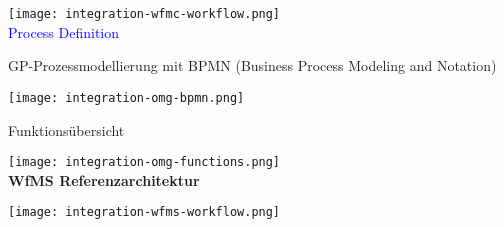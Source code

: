 \texttt{[image: integration-wfmc-workflow.png]} \\

\textcolor{blue}{Process Definition}

GP-Prozessmodellierung mit BPMN (Business Process Modeling and Notation)

\texttt{[image: integration-omg-bpmn.png]}

Funktionsübersicht

\texttt{[image: integration-omg-functions.png]} \\

\textbf{WfMS Referenzarchitektur}

\texttt{[image: integration-wfms-workflow.png]}

